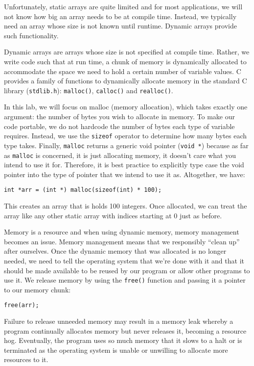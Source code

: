 \documentclass[12pt]{scrartcl}
\begin{document}
Unfortunately, static arrays are quite limited and for most applications, 
we will not know how big an array needs to be at compile time.  
Instead, we typically need an array whose size is not known until 
runtime.  Dynamic arrays provide such functionality.

Dynamic arrays are arrays whose size is not specified at compile 
time.  Rather, we write code such that at run time, a chunk of 
memory is dynamically allocated to accommodate the space we 
need to hold a certain number of variable values.  C provides a 
family of functions to dynamically allocate memory in the standard 
C library (\texttt{stdlib.h}): \texttt{malloc()}, 
\texttt{calloc()} and \texttt{realloc()}.  

In this lab, we will focus on malloc (memory allocation), which takes 
exactly one argument: the number of bytes you wish to allocate in 
memory.  To make our code portable, we do not hardcode the number 
of bytes each type of variable requires.  Instead, we use the 
\texttt{sizeof} operator to determine how many bytes each 
type takes.  Finally, \texttt{malloc} returns a generic void 
pointer (\texttt{void *}) because as far as \texttt{malloc} 
is concerned, it is just allocating memory, it doesn't care what you 
intend to use it for.  Therefore, it is best practice to explicitly type 
case the void pointer into the type of pointer that we intend to use 
it as.  Altogether, we have:

\texttt{int *arr = (int *) malloc(sizeof(int) * 100);}

This creates an array that is holds 100 integers.  Once allocated, 
we can treat the array like any other static array with indices 
starting at 0 just as before.

Memory is a resource and when using dynamic memory, memory 
management becomes an issue.  Memory management means 
that we responsibly ``clean up'' after ourselves.  Once the dynamic 
memory that was allocated is no longer needed, we need to tell 
the operating system that we're done with it and that it should be 
made available to be reused by our program or allow other 
programs to use it.  We release memory by using the \texttt{free()} 
function and passing it a pointer to our memory chunk:

\texttt{free(arr);}

Failure to release unneeded memory may result in a memory leak 
whereby a program continually allocates memory but never releases 
it, becoming a resource hog.  Eventually, the program uses so much 
memory that it slows  to a halt or is terminated as the operating 
system is unable or unwilling to allocate more resources to it.
\end{document}
